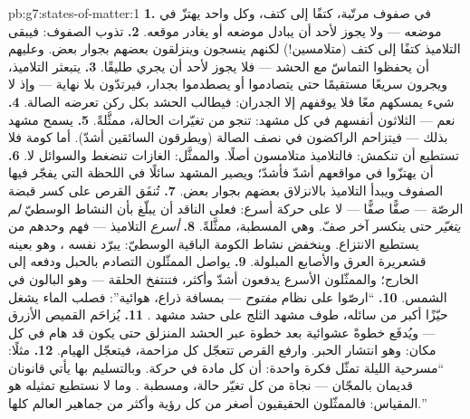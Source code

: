\begin{solution}{pb:g7:states-of-matter:1}
\textbf{1.} في صفوف مرتّبة، كتفًا إلى كتف، وكل واحد يهتزّ في
موضعه --- ولا يجوز لأحد أن يبادل موضعه أو يغادر موقعه.
\textbf{2.} تذوب الصفوف: فيبقى التلاميذ كتفًا إلى كتف
(متلامسين!) لكنهم ينسجون وينزلقون بعضهم بجوار بعض. وعليهم أن
يحفظوا التماسّ مع الحشد --- فلا يجوز لأحد أن يجري طليقًا.
\textbf{3.} يتبعثر التلاميذ، ويجرون سريعًا مستقيمًا حتى
يتصادموا أو يصطدموا بجدار، فيرتدّون بلا نهاية --- وإذ لا شيء
يمسكهم معًا فلا يوقفهم إلا الجدران: فيطالب الحشد بكل ركن
تعرضه الصالة.
\textbf{4.} نعم --- الثلاثون أنفسهم في كل مشهد:  تنجو
من تغيّرات الحالة، ممثَّلةً.
\textbf{5.} يسمح مشهد  بذلك --- فيتزاحم الراكضون في نصف
الصالة (ويطرقون السائقين أشدّ). أما كومة  فلا تستطيع أن
تنكمش: فالتلاميذ متلامسون أصلًا. والممثَّل: الغازات تنضغط
والسوائل لا.
\textbf{6.} أن يهتزّوا في مواقعهم أشدّ فأشدّ؛ ويصير المشهد
سائلًا في اللحظة التي يفجّر فيها  الصفوف ويبدأ
التلاميذ بالانزلاق بعضهم بجوار بعض.
\textbf{7.} تُنفَق  القرص على كسر قبضة الرصّة --- صفًّا
صفًّا --- لا على حركة أسرع: فعلى الناقد  أن يبلّغ
بأن النشاط الوسطيّ \emph{لم يتغيّر} حتى ينكسر آخر صفّ. وهي
المسطبة، ممثَّلةً.
\textbf{8.} \emph{أسرع} التلاميذ --- فهم وحدهم من يستطيع
الانتزاع. وينخفض نشاط الكومة الباقية الوسطيّ:  يبرّد
نفسه ، وهو بعينه قشعريرة العرق والأصابع المبلولة.
\textbf{9.} يواصل الممثّلون التصادم بالحبل ودفعه إلى الخارج؛
والممثّلون الأسرع يدفعون أشدّ وأكثر، فتنتفخ الحلقة --- وهو
البالون في الشمس.
\textbf{10.} ``ارصّوا على نظام \emph{مفتوح} --- بمسافة ذراع،
هوائية'': فصلب الماء يشغل حيّزًا أكبر من سائله،  طوف مشهد
الثلج على حشد مشهد .
\textbf{11.} يُزاحَم القميص الأزرق --- ويُدفَع خطوةً عشوائية
بعد خطوة عبر الحشد المنزلق حتى يكون قد هام في كل مكان: وهو
انتشار الحبر. وارفع القرص تتعجّل كل مزاحمة، فيتعجّل الهيام.
\textbf{12.} مثلًا: ``مسرحية الليلة تمثّل فكرة واحدة: أن كل
مادة  في حركة. وبالتسليم بها يأتي قانونان قديمان
بالمجّان --- نجاة  من كل تغيّر حالة، ومسطبة .
وما لا نستطيع تمثيله هو المقياس: فالممثّلون الحقيقيون أصغر من
كل رؤية وأكثر من جماهير العالم كلها.''
\end{solution}
